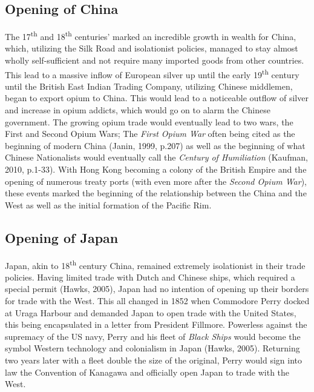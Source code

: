 \documentclass[man,donotrepeattitle,letter]{apa6}
\begin{document}
\subsection{Opening of China}
The 17\textsuperscript{th}  and 18\textsuperscript{th}  centuries' marked an incredible growth in wealth for China, which, utilizing the Silk Road and isolationist policies, managed to stay almost wholly self-sufficient and not require many imported goods from other countries.  This lead to a massive inflow of European silver up until the early 19\textsuperscript{th}  century until the British East Indian Trading Company, utilizing Chinese middlemen, began to export opium to China.  This would lead to a noticeable outflow of silver and increase in opium addicts, which would go on to alarm the Chinese government.  The growing opium trade would eventually lead to two wars, the First and Second Opium Wars; The \textit{First Opium War} often being cited as the beginning of modern China (Janin, 1999, p.207) as well as the beginning of what Chinese Nationalists would eventually call the \textit{Century of Humiliation} (Kaufman, 2010, p.1-33).  With Hong Kong becoming a colony of the British Empire and the opening of numerous treaty ports (with even more after the \textit{Second Opium War}), these events marked the beginning of the relationship between the China and the West as well as the initial formation of the Pacific Rim.

\subsection{Opening of Japan}
Japan, akin to 18\textsuperscript{th}  century China, remained extremely isolationist in their trade policies.  Having limited trade with Dutch and Chinese ships, which required a special permit (Hawks, 2005), Japan had no intention of opening up their borders for trade with the West.  This all changed in 1852 when Commodore Perry docked at Uraga Harbour and demanded Japan to open trade with the United States, this being encapsulated in a letter from President Fillmore.  Powerless against the supremacy of the US navy, Perry and his fleet of \textit{Black Ships} would become the symbol Western technology and colonialism in Japan (Hawks, 2005).  Returning two years later with a fleet double the size of the original, Perry would sign into law the Convention of Kanagawa and officially open Japan to trade with the West.
\end{document}
